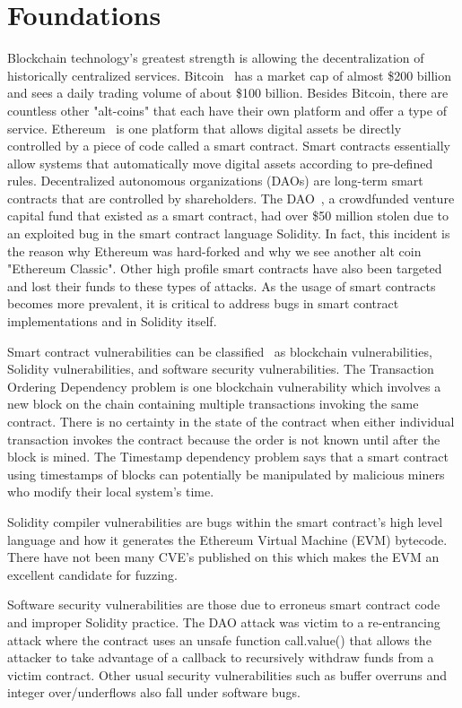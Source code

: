 \section{Foundations}
Blockchain technology's greatest strength is allowing the decentralization of historically centralized services.
Bitcoin~\cite{bitcoin} has a market cap of almost \$200 billion and sees a daily trading volume of about \$100 billion. 
Besides Bitcoin, there are countless other "alt-coins" that each have their own platform and offer a type of service.
Ethereum~\cite{ethereum} is one platform that allows digital assets be directly controlled by a piece of code called a smart contract.
Smart contracts essentially allow systems that automatically move digital assets according to pre-defined rules.
Decentralized autonomous organizations (DAOs) are long-term smart contracts that are controlled by shareholders.
The DAO~\cite{dao}, a crowdfunded venture capital fund that existed as a smart contract, had over \$50 million stolen due to an exploited bug in the smart contract language Solidity.
In fact, this incident is the reason why Ethereum was hard-forked and why we see another alt coin "Ethereum Classic".
Other high profile smart contracts have also been targeted and lost their funds to these types of attacks.
As the usage of smart contracts becomes more prevalent, it is critical to address bugs in smart contract implementations and in Solidity itself.

Smart contract vulnerabilities can be classified~\cite{vulnerabilities} as blockchain vulnerabilities, Solidity vulnerabilities, and software security vulnerabilities.
The Transaction Ordering Dependency problem is one blockchain vulnerability which involves a new block on the chain containing multiple transactions invoking the same contract.
There is no certainty in the state of the contract when either individual transaction invokes the contract because the order is not known until after the block is mined.
The Timestamp dependency problem says that a smart contract using timestamps of blocks can potentially be manipulated by malicious miners who modify their local system's time.

Solidity compiler vulnerabilities are bugs within the smart contract's high level language and how it generates the Ethereum Virtual Machine (EVM) bytecode.
There have not been many CVE's published on this which makes the EVM an excellent candidate for fuzzing.

Software security vulnerabilities are those due to erroneus smart contract code and improper Solidity practice.
The DAO attack was victim to a re-entrancing attack where the contract uses an unsafe function call.value() that allows the attacker to take advantage of a callback to recursively withdraw funds from a victim contract.
Other usual security vulnerabilities such as buffer overruns and integer over/underflows also fall under software bugs.

